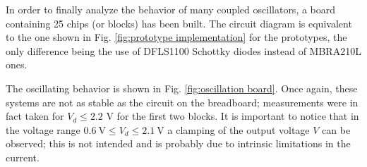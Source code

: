 \documentclass[a4paper,11pt,aps,secnumarabic,balancelastpage,amsmath,amssymb,floatfix,table]{article}
\begin{document}
In order to finally analyze the behavior of many coupled
oscillators, a board containing 25 chips (or blocks) has been built.
The circuit diagram is equivalent to the one shown in Fig.
\ref{fig:prototype implementation} for the prototypes, the only
difference being the use of DFLS1100 Schottky diodes instead of
MBRA210L ones.

The oscillating behavior is shown in Fig.
\ref{fig:oscillation board}. Once again, these systems are not as
stable as the circuit on the breadboard; measurements were in fact
taken for $V_d \leq 2.2$ V for the first two blocks. It is important to notice
that in the voltage range $0.6~\text{V} \leq V_d \leq 2.1~\text{V}$
a clamping of the output voltage $V$ can be observed; this is not
intended and is probably due to intrinsic limitations in the current.
\end{document}
